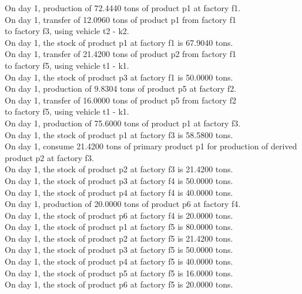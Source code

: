 \begin{tabbing}
On day 1, production of 72.4440 tons of product p1 at factory f1. \\
On day 1, transfer of 12.0960 tons of product p1 from factory f1 \\ to factory f3, using vehicle t2 - k2. \\
On day 1, the stock of product p1 at factory f1 is 67.9040 tons. \\
On day 1, transfer of 21.4200 tons of product p2 from factory f1 \\ to factory f5, using vehicle t1 - k1. \\
On day 1, the stock of product p3 at factory f1 is 50.0000 tons. \\
On day 1, production of 9.8304 tons of product p5 at factory f2. \\
On day 1, transfer of 16.0000 tons of product p5 from factory f2 \\ to factory f5, using vehicle t1 - k1. \\
On day 1, production of 75.6000 tons of product p1 at factory f3. \\
On day 1, the stock of product p1 at factory f3 is 58.5800 tons. \\
On day 1, consume 21.4200 tons of primary product p1 for production of derived product p2 at factory f3. \\
On day 1, the stock of product p2 at factory f3 is 21.4200 tons. \\
On day 1, the stock of product p3 at factory f4 is 50.0000 tons. \\
On day 1, the stock of product p4 at factory f4 is 40.0000 tons. \\
On day 1, production of 20.0000 tons of product p6 at factory f4. \\
On day 1, the stock of product p6 at factory f4 is 20.0000 tons. \\
On day 1, the stock of product p1 at factory f5 is 80.0000 tons. \\
On day 1, the stock of product p2 at factory f5 is 21.4200 tons. \\
On day 1, the stock of product p3 at factory f5 is 50.0000 tons. \\
On day 1, the stock of product p4 at factory f5 is 40.0000 tons. \\
On day 1, the stock of product p5 at factory f5 is 16.0000 tons. \\
On day 1, the stock of product p6 at factory f5 is 20.0000 tons. \\
\end{tabbing} \vspace{-2.0em}
